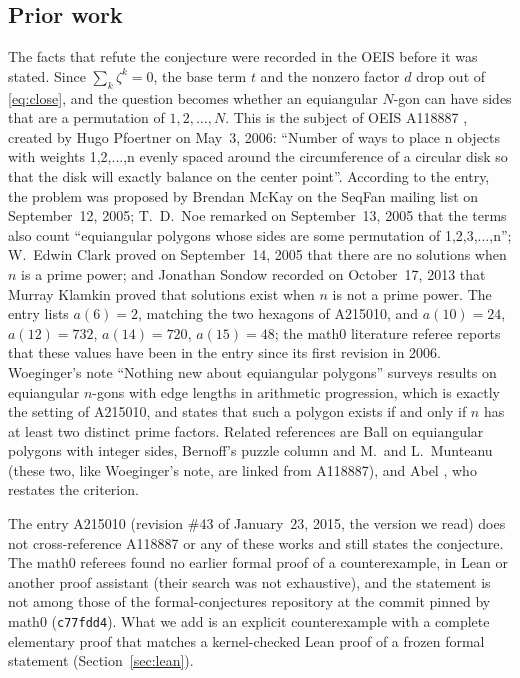 \documentclass[11pt]{amsart}
\theoremstyle{plain}
\theoremstyle{definition}
\begin{document}
\subsection*{Prior work}
The facts that refute the conjecture were recorded in the OEIS before it was stated.
Since $\sum_k\zeta^k=0$, the base term $t$ and the nonzero factor $d$ drop out of \eqref{eq:close}, and the question becomes whether an equiangular $N$-gon can have sides that are a permutation of $1,2,\dots,N$.
This is the subject of OEIS A118887 \cite{A118887}, created by Hugo Pfoertner on May~3, 2006: ``Number of ways to place n objects with weights 1,2,...,n evenly spaced around the circumference of a circular disk so that the disk will exactly balance on the center point''.
According to the entry, the problem was proposed by Brendan McKay on the SeqFan mailing list on September~12, 2005; T.~D.~Noe remarked on September~13, 2005 that the terms also count ``equiangular polygons whose sides are some permutation of 1,2,3,...,n''; W.~Edwin Clark proved on September~14, 2005 that there are no solutions when $n$ is a prime power; and Jonathan Sondow recorded on October~17, 2013 that Murray Klamkin proved that solutions exist when $n$ is not a prime power.
The entry lists $a(6)=2$, matching the two hexagons of A215010, and $a(10)=24$, $a(12)=732$, $a(14)=720$, $a(15)=48$; the math0 literature referee reports that these values have been in the entry since its first revision in 2006.
Woeginger's note ``Nothing new about equiangular polygons'' \cite{Woeginger} surveys results on equiangular $n$-gons with edge lengths in arithmetic progression, which is exactly the setting of A215010, and states that such a polygon exists if and only if $n$ has at least two distinct prime factors.
Related references are Ball \cite{Ball} on equiangular polygons with integer sides, Bernoff's puzzle column \cite{Bernoff} and M.~and L.~Munteanu \cite{Munteanu} (these two, like Woeginger's note, are linked from A118887), and Abel \cite{Abel}, who restates the criterion.

The entry A215010 (revision \#43 of January~23, 2015, the version we read) does not cross-reference A118887 or any of these works and still states the conjecture.
The math0 referees found no earlier formal proof of a counterexample, in Lean or another proof assistant (their search was not exhaustive), and the statement is not among those of the formal-conjectures repository \cite{FC} at the commit pinned by math0 (\texttt{c77fdd4}).
What we add is an explicit counterexample with a complete elementary proof that matches a kernel-checked Lean proof of a frozen formal statement (Section~\ref{sec:lean}).
\end{document}
